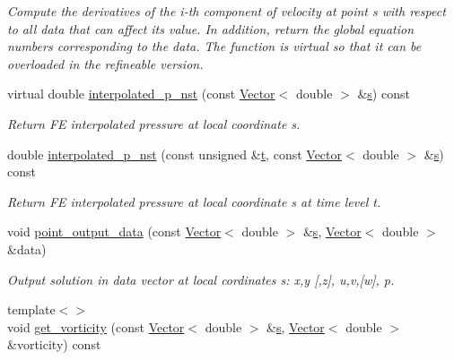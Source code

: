 \begin{DoxyCompactItemize}
\begin{DoxyCompactList}\small\item\em Compute the derivatives of the i-\/th component of velocity at point s with respect to all data that can affect its value. In addition, return the global equation numbers corresponding to the data. The function is virtual so that it can be overloaded in the refineable version. \end{DoxyCompactList}\item 
virtual double \hyperlink{classoomph_1_1GeneralisedNewtonianNavierStokesEquations_ae8667c5b11f023c60dda98329f9c13f3}{interpolated\+\_\+p\+\_\+nst} (const \hyperlink{classoomph_1_1Vector}{Vector}$<$ double $>$ \&\hyperlink{cfortran_8h_ab7123126e4885ef647dd9c6e3807a21c}{s}) const
\begin{DoxyCompactList}\small\item\em Return FE interpolated pressure at local coordinate s. \end{DoxyCompactList}\item 
double \hyperlink{classoomph_1_1GeneralisedNewtonianNavierStokesEquations_a864e9249bdc2f1c200c2d550126796ec}{interpolated\+\_\+p\+\_\+nst} (const unsigned \&\hyperlink{cfortran_8h_af6f0bd3dc13317f895c91323c25c2b8f}{t}, const \hyperlink{classoomph_1_1Vector}{Vector}$<$ double $>$ \&\hyperlink{cfortran_8h_ab7123126e4885ef647dd9c6e3807a21c}{s}) const
\begin{DoxyCompactList}\small\item\em Return FE interpolated pressure at local coordinate s at time level t. \end{DoxyCompactList}\item 
void \hyperlink{classoomph_1_1GeneralisedNewtonianNavierStokesEquations_a85cfe5eddc8339b7788100f00769ee46}{point\+\_\+output\+\_\+data} (const \hyperlink{classoomph_1_1Vector}{Vector}$<$ double $>$ \&\hyperlink{cfortran_8h_ab7123126e4885ef647dd9c6e3807a21c}{s}, \hyperlink{classoomph_1_1Vector}{Vector}$<$ double $>$ \&data)
\begin{DoxyCompactList}\small\item\em Output solution in data vector at local cordinates s\+: x,y \mbox{[},z\mbox{]}, u,v,\mbox{[}w\mbox{]}, p. \end{DoxyCompactList}\item 
{\footnotesize template$<$$>$ }\\void \hyperlink{classoomph_1_1GeneralisedNewtonianNavierStokesEquations_a64121c8f382640b7a1dcf1f71770f926}{get\+\_\+vorticity} (const \hyperlink{classoomph_1_1Vector}{Vector}$<$ double $>$ \&\hyperlink{cfortran_8h_ab7123126e4885ef647dd9c6e3807a21c}{s}, \hyperlink{classoomph_1_1Vector}{Vector}$<$ double $>$ \&vorticity) const

\end{DoxyCompactItemize}

